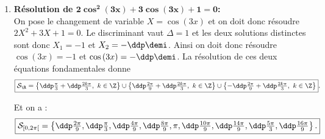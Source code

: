 \begin{correction}
\begin{enumerate}
\begin{minipage}[c]{0.45\textwidth}
\end{minipage}
\quad \begin{minipage}[c]{0.45\textwidth}
\begin{center}
\end{center}
\end{minipage}
\item \textbf{R\'esolution de $\mathbf{ 2\cos^2{(3x)}+3\cos{(3x)}+1=0    }$:}\\
\noindent On pose le changement de variable $X=\cos{(3x)}$ et on doit donc r\'esoudre $2X^2+3X+1=0$. Le discriminant vaut $\Delta=1$ et les deux solutions distinctes sont donc $X_1=-1$ et $X_2=-\ddp\demi$. Ainsi on doit donc r\'esoudre $\cos{(3x)}=-1$ et $\cos{(3x)}=-\ddp\demi$. La r\'esolution de ces deux \'equations fondamentales donne 
$$ \fbox{$\mathcal{S}_{\R}=\left\lbrace  \ddp\frac{\pi}{3}+\ddp\frac{2k\pi}{3} ,\ k\in\Z\right\rbrace\cup\left\lbrace  \ddp\frac{2\pi}{9}+\ddp\frac{2k\pi}{3},\ k\in\Z\right\rbrace\cup\left\lbrace  -\ddp\frac{2\pi}{9}+\ddp\frac{2k\pi}{3},\ k\in\Z\right\rbrace$}.$$
\begin{minipage}[c]{0.45\textwidth}
Et on a :
$$ \fbox{$\mathcal{S}_{\lbrack 0,2\pi\lbrack}=\left\lbrace \ddp\frac{2\pi}{9} , \ddp\frac{\pi}{3},\ddp\frac{4\pi}{9} ,\ddp\frac{8\pi}{9},\pi,\ddp\frac{10\pi}{9},\ddp\frac{14\pi}{9},\ddp\frac{5\pi}{3},\ddp\frac{16\pi}{9} \right\rbrace .$}$$
\end{minipage}
\quad \begin{minipage}[c]{0.45\textwidth}

\end{minipage}
\end{enumerate}
\end{correction}
